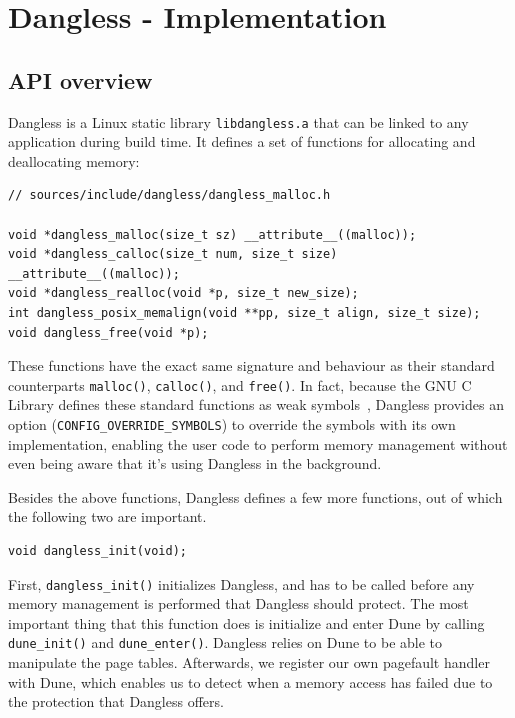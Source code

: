 \chapter{Dangless - Implementation}
\label{ch:implementation}

\section{API overview}

Dangless is a Linux static library \texttt{libdangless.a} that can be linked to any application during build time.  It defines a set of functions for allocating and deallocating memory:

\begin{lstlisting}
// sources/include/dangless/dangless_malloc.h

void *dangless_malloc(size_t sz) __attribute__((malloc));
void *dangless_calloc(size_t num, size_t size) __attribute__((malloc));
void *dangless_realloc(void *p, size_t new_size);
int dangless_posix_memalign(void **pp, size_t align, size_t size);
void dangless_free(void *p);
\end{lstlisting}

These functions have the exact same signature and behaviour as their standard counterparts \lstinline!malloc()!, \lstinline!calloc()!, and \lstinline!free()!. In fact, because the GNU C Library defines these standard functions as weak symbols~\cite{glibc-malloc-is-weak}, Dangless provides an option (\lstinline!CONFIG_OVERRIDE_SYMBOLS!) to override the symbols with its own implementation, enabling the user code to perform memory management without even being aware that it's using Dangless in the background.

Besides the above functions, Dangless defines a few more functions, out of which the following two are important.

\begin{lstlisting}
void dangless_init(void);
\end{lstlisting}

First, \lstinline!dangless_init()! initializes Dangless, and has to be called before any memory management is performed that Dangless should protect. The most important thing that this function does is initialize and enter Dune by calling \lstinline!dune_init()! and \lstinline!dune_enter()!. Dangless relies on Dune to be able to manipulate the page tables. Afterwards, we register our own pagefault handler with Dune, which enables us to detect when a memory access has failed due to the protection that Dangless offers.

